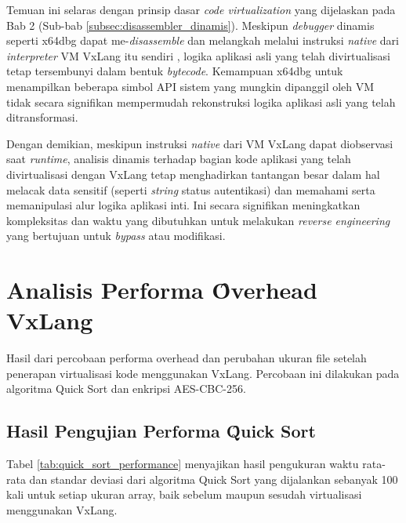 Temuan ini selaras dengan prinsip dasar \textit{code virtualization} yang dijelaskan pada Bab 2 (Sub-bab \ref{subsec:disassembler_dinamis}). Meskipun \textit{debugger} dinamis seperti x64dbg dapat me-\textit{disassemble} dan melangkah melalui instruksi \textit{native} dari \textit{interpreter} VM VxLang itu sendiri \cite{Sikorski2012}, logika aplikasi asli yang telah divirtualisasi tetap tersembunyi dalam bentuk \textit{bytecode}. Kemampuan x64dbg untuk menampilkan beberapa simbol API sistem yang mungkin dipanggil oleh VM tidak secara signifikan mempermudah rekonstruksi logika aplikasi asli yang telah ditransformasi.

Dengan demikian, meskipun instruksi \textit{native} dari VM VxLang dapat diobservasi saat \textit{runtime}, analisis dinamis terhadap bagian kode aplikasi yang telah divirtualisasi dengan VxLang tetap menghadirkan tantangan besar dalam hal melacak data sensitif (seperti \textit{string} status autentikasi) dan memahami serta memanipulasi alur logika aplikasi inti. Ini secara signifikan meningkatkan kompleksitas dan waktu yang dibutuhkan untuk melakukan \textit{reverse engineering} yang bertujuan untuk \textit{bypass} atau modifikasi.

\section{Analisis Performa \f{Overhead} VxLang}
Hasil dari percobaan performa overhead dan perubahan ukuran file setelah penerapan virtualisasi kode menggunakan VxLang. Percobaan ini dilakukan pada algoritma Quick Sort dan enkripsi AES-CBC-256.

\subsection{Hasil Pengujian Performa \f{Quick Sort}}
Tabel \ref{tab:quick_sort_performance} menyajikan hasil pengukuran waktu rata-rata dan standar deviasi dari algoritma Quick Sort yang dijalankan sebanyak 100 kali untuk setiap ukuran array, baik sebelum maupun sesudah virtualisasi menggunakan VxLang. 

